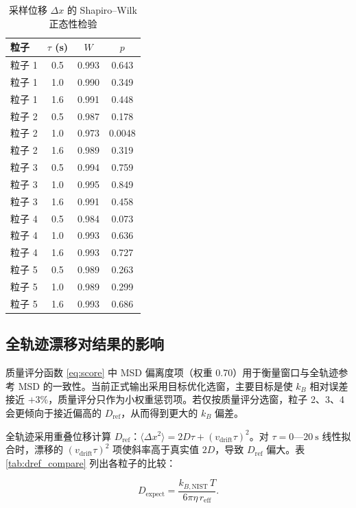 \documentclass[12pt,a4paper]{ctexart}
\begin{document}
\begin{table}[h]
\centering
\caption{采样位移 $\Delta x$ 的 Shapiro--Wilk 正态性检验}
\label{tab:normality}
\begin{tabular}{lccc}
\toprule
粒子 & $\tau$ (s) & $W$ & $p$ \\
\midrule
粒子 1 & 0.5 & 0.993 & 0.643 \\
粒子 1 & 1.0 & 0.990 & 0.349 \\
粒子 1 & 1.6 & 0.991 & 0.448 \\
粒子 2 & 0.5 & 0.987 & 0.178 \\
粒子 2 & 1.0 & 0.973 & 0.0048 \\
粒子 2 & 1.6 & 0.989 & 0.319 \\
粒子 3 & 0.5 & 0.994 & 0.759 \\
粒子 3 & 1.0 & 0.995 & 0.849 \\
粒子 3 & 1.6 & 0.991 & 0.458 \\
粒子 4 & 0.5 & 0.984 & 0.073 \\
粒子 4 & 1.0 & 0.993 & 0.636 \\
粒子 4 & 1.6 & 0.993 & 0.727 \\
粒子 5 & 0.5 & 0.989 & 0.263 \\
粒子 5 & 1.0 & 0.989 & 0.299 \\
粒子 5 & 1.6 & 0.993 & 0.686 \\
\bottomrule
\end{tabular}
\end{table}

\subsection{全轨迹漂移对结果的影响}
\label{subsec:drift_effect}

质量评分函数 \eqref{eq:score} 中 MSD 偏离度项（权重 0.70）用于衡量窗口与全轨迹参考 MSD 的一致性。当前正式输出采用目标优化选窗，主要目标是使 $k_B$ 相对误差接近 $+3\%$，质量评分只作为小权重惩罚项。若仅按质量评分选窗，粒子 2、3、4 会更倾向于接近偏高的 $D_\text{ref}$，从而得到更大的 $k_B$ 偏差。

全轨迹采用重叠位移计算 $D_\text{ref}$：$\langle\Delta x^2\rangle = 2D\tau + (v_\text{drift}\tau)^2$。对
$\tau=0$—$\SI{20}{\second}$ 线性拟合时，漂移的 $(v_\text{drift}\tau)^2$ 项使斜率高于真实值 $2D$，导致 $D_\text{ref}$ 偏大。表 \ref{tab:dref_compare} 列出各粒子的比较：

\begin{equation}
  D_\text{expect} = \frac{k_{B,\text{NIST}}\,T}{6\pi\eta\,r_\text{eff}}.
\end{equation}
\end{document}
